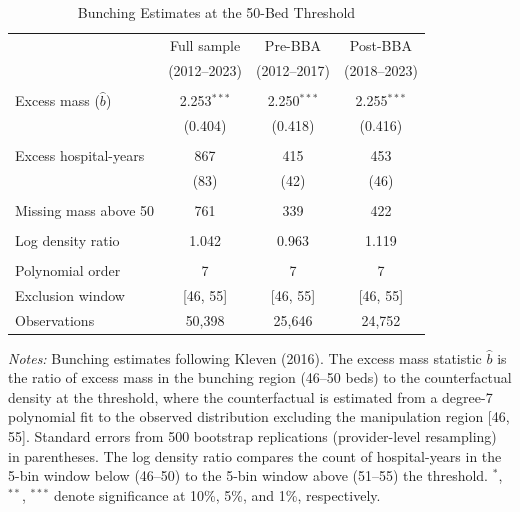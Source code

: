 \begin{table}[t]
\centering
\caption{Bunching Estimates at the 50-Bed Threshold}
\label{tab:bunching}
\begin{tabular}{lccc}
\hline\hline
 & Full sample & Pre-BBA & Post-BBA \\
 & (2012--2023) & (2012--2017) & (2018--2023) \\
\hline
\\[-6pt]
Excess mass ($\hat{b}$) & 2.253$^{***}$ & 2.250$^{***}$ & 2.255$^{***}$ \\
 & (0.404) & (0.418) & (0.416) \\
\\[-6pt]
Excess hospital-years & 867 & 415 & 453 \\
 & (83) & (42) & (46) \\
\\[-6pt]
Missing mass above 50 & 761 & 339 & 422 \\
\\[-6pt]
Log density ratio & 1.042 & 0.963 & 1.119 \\
\\[-6pt]
Polynomial order & 7 & 7 & 7 \\
Exclusion window & [46, 55] & [46, 55] & [46, 55] \\
Observations & 50,398 & 25,646 & 24,752 \\
\hline\hline
\end{tabular}
\begin{tablenotes}
\item \textit{Notes:} Bunching estimates following Kleven (2016). The excess mass statistic $\hat{b}$ is the ratio of excess mass in the bunching region (46--50 beds) to the counterfactual density at the threshold, where the counterfactual is estimated from a degree-7 polynomial fit to the observed distribution excluding the manipulation region [46, 55]. Standard errors from 500 bootstrap replications (provider-level resampling) in parentheses. The log density ratio compares the count of hospital-years in the 5-bin window below (46--50) to the 5-bin window above (51--55) the threshold. $^{*}$, $^{**}$, $^{***}$ denote significance at 10\%, 5\%, and 1\%, respectively.
\end{tablenotes}
\end{table}

